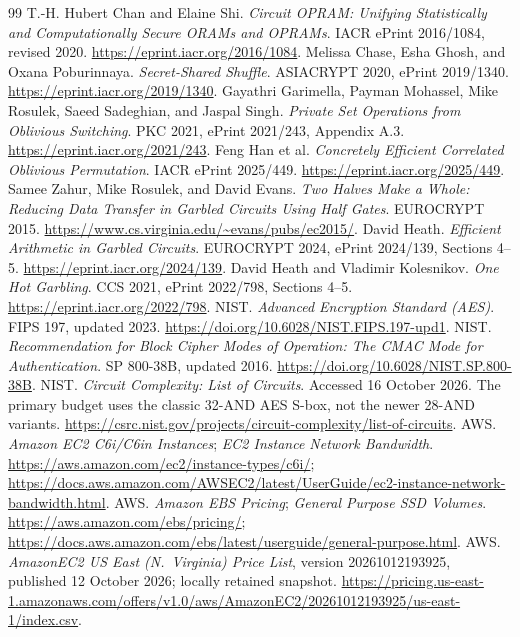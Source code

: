 \documentclass[11pt]{article}
\begin{document}
\begin{thebibliography}{99}\small
{} T.-H. Hubert Chan and Elaine Shi.
\emph{Circuit OPRAM: Unifying Statistically and Computationally Secure ORAMs
and OPRAMs}. IACR ePrint 2016/1084, revised 2020.
\url{https://eprint.iacr.org/2016/1084}.
 Melissa Chase, Esha Ghosh, and Oxana Poburinnaya.
\emph{Secret-Shared Shuffle}. ASIACRYPT 2020, ePrint 2019/1340.
\url{https://eprint.iacr.org/2019/1340}.
 Gayathri Garimella, Payman Mohassel, Mike Rosulek,
Saeed Sadeghian, and Jaspal Singh. \emph{Private Set Operations from
Oblivious Switching}. PKC 2021, ePrint 2021/243, Appendix A.3.
\url{https://eprint.iacr.org/2021/243}.
 Feng Han et al. \emph{Concretely Efficient Correlated
Oblivious Permutation}. IACR ePrint 2025/449.
\url{https://eprint.iacr.org/2025/449}.
 Samee Zahur, Mike Rosulek, and David Evans.
\emph{Two Halves Make a Whole: Reducing Data Transfer in Garbled Circuits
Using Half Gates}. EUROCRYPT 2015.
\url{https://www.cs.virginia.edu/~evans/pubs/ec2015/}.
 David Heath. \emph{Efficient Arithmetic in Garbled
Circuits}. EUROCRYPT 2024, ePrint 2024/139, Sections 4--5.
\url{https://eprint.iacr.org/2024/139}.
 David Heath and Vladimir Kolesnikov.
\emph{One Hot Garbling}. CCS 2021, ePrint 2022/798, Sections 4--5.
\url{https://eprint.iacr.org/2022/798}.
 NIST. \emph{Advanced Encryption Standard (AES)}.
FIPS 197, updated 2023. \url{https://doi.org/10.6028/NIST.FIPS.197-upd1}.
 NIST. \emph{Recommendation for Block Cipher Modes of
Operation: The CMAC Mode for Authentication}. SP 800-38B, updated 2016.
\url{https://doi.org/10.6028/NIST.SP.800-38B}.
 NIST. \emph{Circuit Complexity: List of Circuits}.
Accessed 16 October 2026. The primary budget uses the classic 32-AND AES
S-box, not the newer 28-AND variants.
\url{https://csrc.nist.gov/projects/circuit-complexity/list-of-circuits}.
 AWS. \emph{Amazon EC2 C6i/C6in Instances};
\emph{EC2 Instance Network Bandwidth}.
\url{https://aws.amazon.com/ec2/instance-types/c6i/};
\url{https://docs.aws.amazon.com/AWSEC2/latest/UserGuide/ec2-instance-network-bandwidth.html}.
 AWS. \emph{Amazon EBS Pricing}; \emph{General Purpose SSD
Volumes}. \url{https://aws.amazon.com/ebs/pricing/};
\url{https://docs.aws.amazon.com/ebs/latest/userguide/general-purpose.html}.
 AWS. \emph{AmazonEC2 US East (N.~Virginia) Price List},
version 20261012193925, published 12 October 2026; locally retained snapshot.
\url{https://pricing.us-east-1.amazonaws.com/offers/v1.0/aws/AmazonEC2/20261012193925/us-east-1/index.csv}.
\end{thebibliography}
\end{document}
